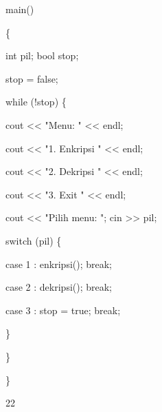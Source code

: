 \documentclass{article}
\begin{document}

main()

\{

  int pil; bool stop;

  stop = false; 

  while (!stop) \{

     cout << "Menu: " << endl;

     cout << "1. Enkripsi " << endl;

     cout << "2. Dekripsi " << endl;

     cout << "3. Exit     " << endl;

     cout << "Pilih menu: "; cin >> pil; 

     switch (pil) \{

        case 1 : enkripsi(); break;

        case 2 : dekripsi(); break;

        case 3 : stop = true; break;

     \} 

  \}

\}

22
\end{document}
